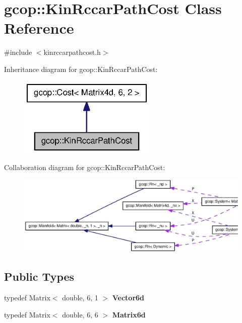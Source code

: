 \section{gcop\-:\-:\-Kin\-Rccar\-Path\-Cost \-Class \-Reference}
\label{classgcop_1_1KinRccarPathCost}


{\ttfamily \#include $<$kinrccarpathcost.\-h$>$}



\-Inheritance diagram for gcop\-:\-:\-Kin\-Rccar\-Path\-Cost\-:
\nopagebreak
\begin{figure}[H]
\begin{center}
\leavevmode
\includegraphics[width=186pt]{classgcop_1_1KinRccarPathCost__inherit__graph}
\end{center}
\end{figure}


\-Collaboration diagram for gcop\-:\-:\-Kin\-Rccar\-Path\-Cost\-:
\nopagebreak
\begin{figure}[H]
\begin{center}
\leavevmode
\includegraphics[width=350pt]{classgcop_1_1KinRccarPathCost__coll__graph}
\end{center}
\end{figure}
\subsection*{\-Public \-Types}
\begin{DoxyCompactItemize}
\item 
typedef \-Matrix$<$ double, 6, 1 $>$ {\bf \-Vector6d}
\item 
typedef \-Matrix$<$ double, 6, 6 $>$ {\bf \-Matrix6d}
\end{DoxyCompactItemize}
